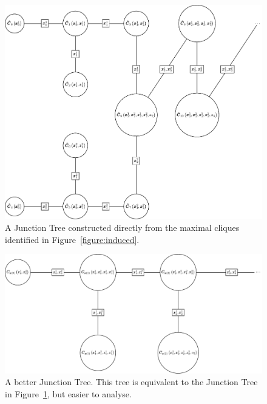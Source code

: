 \begin{figure}[!ht]
	\centering
		\includegraphics[scale=0.5]{tikz/j_tree_1.pdf}
		\caption[The initial Junction Tree.]{A Junction Tree constructed directly from the maximal cliques identified in Figure~\ref{figure:induced}.}
	\label{figure:j_tree_1}
\end{figure}
\begin{figure}[!ht]
	\centering
	\includegraphics[scale=0.625]{tikz/j_tree_2.pdf}
	\caption[A better Junction tree.]{A better Junction Tree. This tree is equivalent to the Junction Tree in Figure~\ref{figure:j_tree_1}, but easier to analyse.}
	\label{figure:j_tree_2}
\end{figure}